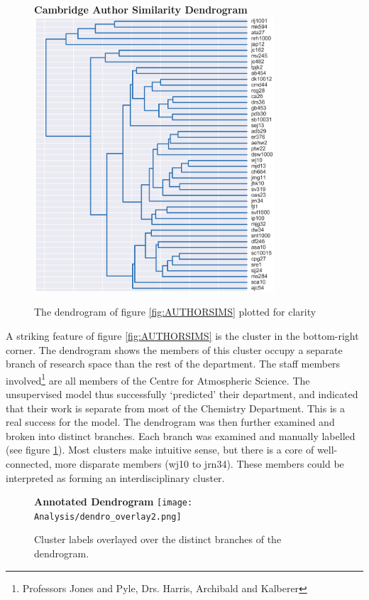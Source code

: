 \begin{center}
\begin{figure}[H]
  \centering
  \textbf{Cambridge Author Similarity Dendrogram}
    \includegraphics[width=0.8\textwidth]{Analysis/dendro.png}
    \caption[Cambridge Author Similarity Dendrogram]{The dendrogram of figure \ref{fig:AUTHORSIMS} plotted for clarity}
\end{figure} 
\label{fig:DENDRO}
\end{center}
A striking feature of figure \ref{fig:AUTHORSIMS} is the cluster in the bottom-right corner. The dendrogram shows the members of this cluster occupy a separate branch of research space than the rest of the department. The staff members involved\footnote{Professors Jones and Pyle, Drs. Harris, Archibald and Kalberer} are all members of the Centre for Atmospheric Science. The unsupervised model thus successfully `predicted' their department, and indicated that their work is separate from most of the Chemistry Department. This is a real success for the model. The dendrogram was then further examined and broken into distinct branches. Each branch was examined and manually labelled (see figure \ref{fig:LABELLEDDENDRO}). Most clusters make intuitive sense, but there is a core of well-connected, more disparate members (wj10 to jrn34). These members could be interpreted as forming an interdisciplinary cluster.  
\begin{center}
\begin{figure}[H]
  \centering
  \textbf{Annotated Dendrogram}
    \texttt{[image: Analysis/dendro\_overlay2.png]}
    \caption[Dendrogram annotated with labelled fields]{Cluster labels overlayed over the distinct branches of the dendrogram.}
    \label{fig:LABELLEDDENDRO}
\end{figure} 
\end{center}
